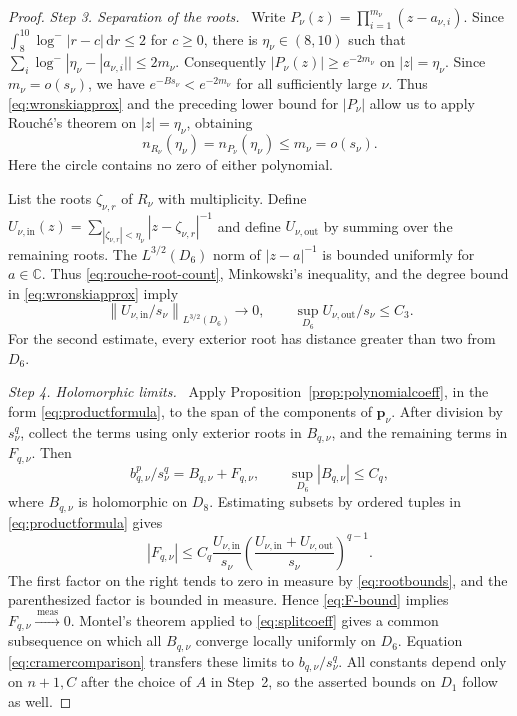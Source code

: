 \documentclass[11pt,letterpaper,reqno]{amsart}
\theoremstyle{remark}
\numberwithin{equation}{section}
\newcommand{\C}{\mathbb C}
\newcommand{\convmeas}{\xrightarrow{\,\mathrm{meas}\,}}
\newcommand{\pv}{\bm p}
\newcommand{\step}[1]{\medskip\noindent\emph{#1}\ }
\begin{document}
\begin{proof}
\step{Step 3. Separation of the roots.}
Write $P_\nu(z)=\prod_{i=1}^{m_\nu}(z-a_{\nu,i})$. Since
$\int_8^{10}\log^-|r-c|\,\mathrm dr\le2$ for $c\ge0$, there is
$\eta_\nu\in(8,10)$ such that
$\sum_i\log^-|\eta_\nu-|a_{\nu,i}||\le2m_\nu$.
Consequently $|P_\nu(z)|\ge e^{-2m_\nu}$ on $|z|=\eta_\nu$.
Since $m_\nu=o(s_\nu)$, we have
$e^{-Bs_\nu}<e^{-2m_\nu}$ for all sufficiently large $\nu$.
Thus \eqref{eq:wronskiapprox} and the preceding lower bound for
$|P_\nu|$ allow us to apply Rouch\'e's theorem on $|z|=\eta_\nu$,
obtaining
\begin{equation}\label{eq:rouche-root-count}
 n_{R_\nu}(\eta_\nu)=n_{P_\nu}(\eta_\nu)\le m_\nu=o(s_\nu).
\end{equation}
Here the circle contains no zero of either polynomial.

List the roots $\zeta_{\nu,r}$ of $R_\nu$ with multiplicity. Define
$U_{\nu,\mathrm{in}}(z)=\sum_{|\zeta_{\nu,r}|<\eta_\nu}|z-\zeta_{\nu,r}|^{-1}$
and define $U_{\nu,\mathrm{out}}$ by summing over the remaining roots.
The $L^{3/2}(D_6)$ norm of $|z-a|^{-1}$ is bounded uniformly for $a\in\C$.
Thus \eqref{eq:rouche-root-count}, Minkowski's inequality, and the degree
bound in \eqref{eq:wronskiapprox} imply
\begin{equation}\label{eq:rootbounds}
 \left\|U_{\nu,\mathrm{in}}/s_\nu\right\|_{L^{3/2}(D_6)}\longrightarrow0,
 \qquad \sup_{D_6}U_{\nu,\mathrm{out}}/s_\nu\le C_3.
\end{equation}
For the second estimate, every exterior root has distance greater than two
from $D_6$.

\step{Step 4. Holomorphic limits.}
Apply Proposition~\ref{prop:polynomialcoeff}, in the form
\eqref{eq:productformula}, to the span of the components of $\pv_\nu$.
After division by $s_\nu^q$, collect the terms using only exterior roots in
$B_{q,\nu}$, and the remaining terms in $F_{q,\nu}$. Then
\begin{equation}\label{eq:splitcoeff}
 b^p_{q,\nu}/s_\nu^q=B_{q,\nu}+F_{q,\nu},\qquad
 \sup_{D_6}|B_{q,\nu}|\le C_q,
\end{equation}
where $B_{q,\nu}$ is holomorphic on $D_8$. Estimating subsets by ordered
tuples in \eqref{eq:productformula} gives
\begin{equation}\label{eq:F-bound}
 |F_{q,\nu}|\le C_q\frac{U_{\nu,\mathrm{in}}}{s_\nu}
 \left(\frac{U_{\nu,\mathrm{in}}+U_{\nu,\mathrm{out}}}{s_\nu}\right)^{q-1}.
\end{equation}
The first factor on the right tends to zero in measure by
\eqref{eq:rootbounds}, and the parenthesized factor is bounded in measure.
Hence \eqref{eq:F-bound} implies $F_{q,\nu}\convmeas0$.
Montel's theorem applied to \eqref{eq:splitcoeff} gives a common subsequence
on which all $B_{q,\nu}$ converge locally uniformly on $D_6$.
Equation \eqref{eq:cramercomparison} transfers these limits to
$b_{q,\nu}/s_\nu^q$. All constants depend only on $n+1,C$ after the
choice of $A$ in Step~2, so the asserted bounds on $D_1$ follow as well.


\end{proof}
\end{document}
